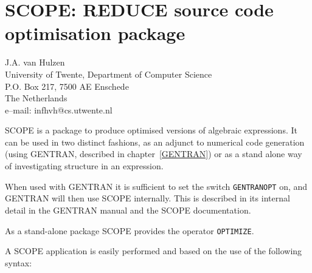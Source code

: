 \chapter[SCOPE: Source code optimisation package]
{SCOPE: REDUCE source code optimisation package}
\label{SCOPE}

{\footnotesize
\begin{center}
J.A. van Hulzen \\
University of Twente, Department of Computer Science \\
P.O. Box 217, 7500 AE Enschede \\
The Netherlands \\[0.05in]
e--mail: infhvh@cs.utwente.nl
\end{center}
}

SCOPE is a package to produce optimised versions of algebraic
expressions.  It can be used in two distinct fashions, as an adjunct
to numerical code generation (using GENTRAN, described in
chapter~\ref{GENTRAN}) or as a stand alone way of investigating
structure in an expression.

When used with GENTRAN it is sufficient to set the
switch {\tt GENTRANOPT} on, and GENTRAN will then
use SCOPE internally.  This is described in its internal detail in the
GENTRAN manual and the SCOPE documentation.

As a stand-alone package SCOPE provides the operator {\tt OPTIMIZE}.

A SCOPE application is easily performed and based on the use of
the following syntax:

